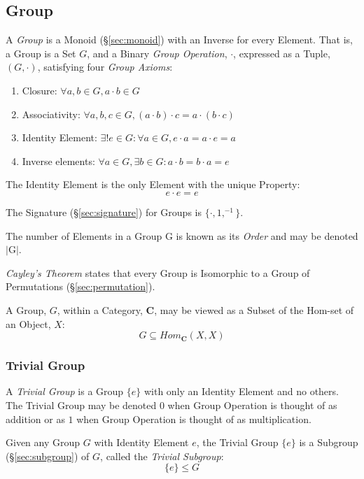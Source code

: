 \subsection{Group}\label{sec:group}

A \emph{Group} is a Monoid (\S\ref{sec:monoid}) with an Inverse for
every Element. That is, a Group is a Set $G$, and a Binary \emph{Group
  Operation}, $\cdot$, expressed as a Tuple, $(G,\cdot)$, satisfying
four \emph{Group Axioms}:
\begin{enumerate}
    \item Closure: $\forall a,b \in G, a \cdot b \in G$
    \item Associativity: $\forall a,b,c \in G, (a \cdot b) \cdot c = a
      \cdot (b \cdot c)$
    \item Identity Element: $\exists! e \in G : \forall a \in G,
      e \cdot a = a \cdot e = a$
    \item Inverse elements: $\forall a \in G, \exists b \in G :
      a \cdot b = b \cdot a = e$
\end{enumerate}
The Identity Element is the only Element with the unique Property:
\[
    e \cdot e = e
\]

The Signature (\S\ref{sec:signature}) for Groups is $\{\cdot, 1,
^{-1}\}$.

The number of Elements in a Group $\mathrm{G}$ is known as its
\emph{Order} and may be denoted $|\mathrm{G}|$.

\emph{Cayley's Theorem} states that every Group is Isomorphic to a
Group of Permutations (\S\ref{sec:permutation}).

A Group, $G$, within a Category, $\mathbf{C}$, may be viewed as a
Subset of the Hom-set of an Object, $X$:
\[
    G \subseteq Hom_{\mathbf{C}}(X,X)
\]



\subsubsection{Trivial Group}\label{sec:trivial_group}

A \emph{Trivial Group} is a Group $\{e\}$ with only an Identity
Element and no others. The Trivial Group may be denoted $0$ when
Group Operation is thought of as addition or as $1$ when Group
Operation is thought of as multiplication.

Given any Group $G$ with Identity Element $e$, the Trivial Group
$\{e\}$ is a Subgroup (\S\ref{sec:subgroup}) of $G$, called the
\emph{Trivial Subgroup}:
\[
    \{e\} \leq G
\]

